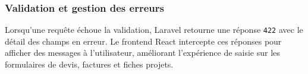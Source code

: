 \subsubsection{Validation et gestion des erreurs}

Lorsqu'une requête échoue la validation, Laravel retourne une réponse \texttt{422}
avec le détail des champs en erreur. Le frontend React intercepte ces réponses pour
afficher des messages à l'utilisateur, améliorant l'expérience de saisie sur les
formulaires de devis, factures et fiches projets.

